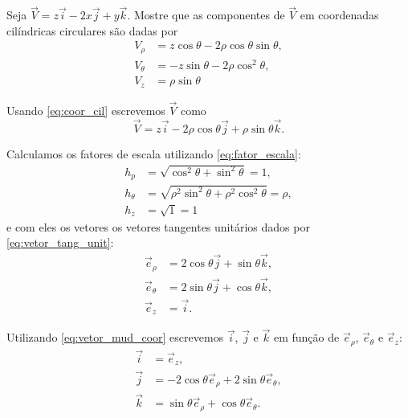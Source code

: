 \documentclass[a4paper,12pt, leqno, answers]{exam}
\begin{document}
\begin{questions}
    \question Seja $\vec{V} = z\vec{i} - 2x\vec{j} + y \vec{k}$. Mostre que as componentes de $\vec{V}$ em coordenadas cil\'{i}ndricas circulares s\~{a}o dadas por
    \begin{align*}
        V_\rho &= z \cos \theta - 2 \rho \cos \theta \sin \theta, \\
        V_\theta &= -z \sin \theta - 2 \rho \cos^2 \theta, \\
        V_z &= \rho \sin \theta
    \end{align*}
    \begin{solution}
        Usando \eqref{eq:coor_cil} escrevemos $\vec{V}$ como
        \[
        \vec{V} = z\vec{i} - 2 \rho \cos \theta \vec{j} + \rho \sin \theta \vec{k}.
        \]
  
        Calculamos os fatores de escala utilizando \eqref{eq:fator_escala}:
        \begin{align*}
            h_p &= \sqrt{\cos^2 \theta + \sin^2 \theta} = 1, \\
            h_\theta &= \sqrt{\rho^2 \sin^2 \theta + \rho^2 \cos^2 \theta} = \rho, \\
            h_z &= \sqrt{1} = 1
        \end{align*}
        e com eles os vetores os vetores tangentes unit\'{a}rios dados por \eqref{eq:vetor_tang_unit}:
        \begin{align*}
            \vec{e}_\rho &= 2 \cos \theta \vec{j} + \sin \theta \vec{k}, \\
            \vec{e}_\theta &= 2 \sin \theta \vec{j} + \cos \theta \vec{k}, \\
            \vec{e}_z &= \vec{i}.
        \end{align*}
  
        Utilizando \eqref{eq:vetor_mud_coor} escrevemos $\vec{i}$, $\vec{j}$ e $\vec{k}$ em fun\c{c}\~{a}o de $\vec{e}_\rho$, $\vec{e}_\theta$ e $\vec{e}_z$:
        \begin{align*}
            \vec{i} &= \vec{e}_z, \\
            \vec{j} &= -2 \cos \theta \vec{e}_\rho + 2 \sin \theta \vec{e}_\theta, \\
            \vec{k} &= \sin \theta \vec{e}_\rho + \cos \theta \vec{e}_\theta.
        \end{align*}
  

\end{solution}
\end{questions}
\end{document}
